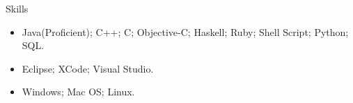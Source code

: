 \documentclass[]{mcdowellcv}
\begin{document}
	\begin{cvsection}{Skills}
		\begin{cvsubsection}{}{}{}	
			\begin{itemize}
				\item Java(Proficient); C++; C; Objective-C; Haskell; Ruby; Shell Script; Python; SQL.  
				\item Eclipse; XCode; Visual Studio.
				\item Windows; Mac OS; Linux. 
			\end{itemize}
		\end{cvsubsection}
	\end{cvsection}
	
\end{document}
